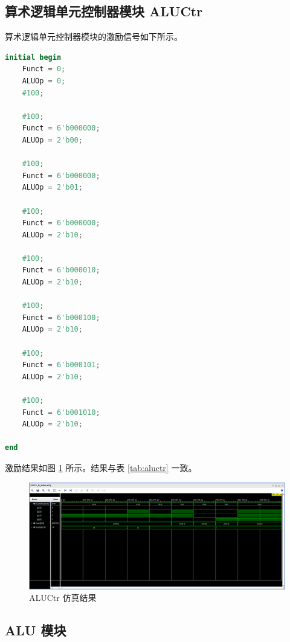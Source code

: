 \documentclass[a4paper,UTF8]{ctexart}
\begin{document}
\subsection{算术逻辑单元控制器模块 ALUCtr}

算术逻辑单元控制器模块的激励信号如下所示。

\begin{multicols}{2}
\begin{lstlisting}[language=verilog,caption={ALUCtr\_tb.v}]
initial begin
    Funct = 0;
    ALUOp = 0;
    #100;

    #100;
    Funct = 6'b000000;
    ALUOp = 2'b00;
    
    #100;
    Funct = 6'b000000;
    ALUOp = 2'b01;

    #100;
    Funct = 6'b000000;
    ALUOp = 2'b10;

    #100;
    Funct = 6'b000010;
    ALUOp = 2'b10;

    #100;
    Funct = 6'b000100;
    ALUOp = 2'b10;

    #100;
    Funct = 6'b000101;
    ALUOp = 2'b10;

    #100;
    Funct = 6'b001010;
    ALUOp = 2'b10;
    
end
\end{lstlisting}
\end{multicols}

激励结果如图 \ref{fig:aluctrtb} 所示。结果与表 \ref{tab:aluctr} 一致。
\begin{figure}
    \centering\includegraphics[width=\textwidth]{figure2.png}\caption{ALUCtr 仿真结果}\label{fig:aluctrtb}
\end{figure}

\subsection{ALU 模块}
\end{document}

